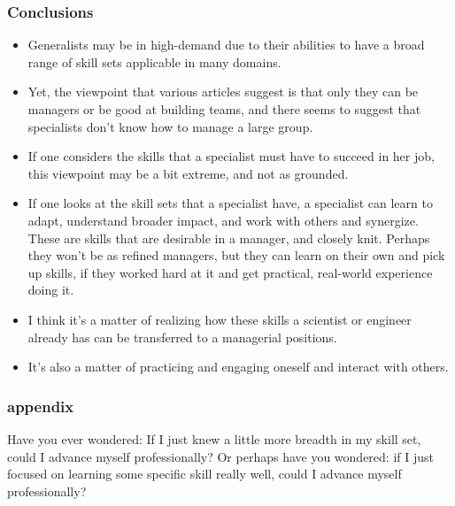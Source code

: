 \begin{frame}
\frametitle{Conclusions}
\begin{itemize}
\item Generalists may be in high-demand due to their abilities to have
  a broad range of skill sets applicable in many domains.
\item  Yet, the viewpoint that various articles suggest is that only they can be managers or be good at building teams, and there seems to suggest that specialists don't know how to manage a large group.
\item  If one considers the skills that a specialist must have to succeed in her job, this viewpoint may be a bit extreme, and not as grounded.
\item If one looks at the skill sets that a specialist have, a
  specialist can learn to adapt, understand broader impact, and work
  with others and synergize. These are skills that are desirable in a
  manager, and closely knit. Perhaps they won't be as refined managers, but they can learn on their own and pick up skills, if they worked hard at it and get practical, real-world experience doing it.
\item I think it's a matter of realizing how these skills a scientist or engineer already has can be transferred to a managerial positions.
\item It's also a matter of practicing and engaging oneself
and interact with others.
\end{itemize}
\end{frame}


\begin{frame}
\frametitle{appendix }

\item \small
\item \small Have you ever wondered: If I just knew a little more breadth in my skill set, could I advance
myself professionally? Or perhaps have you wondered: if I just focused
on learning some specific skill really well, could I advance myself
professionally?

\end{frame}
